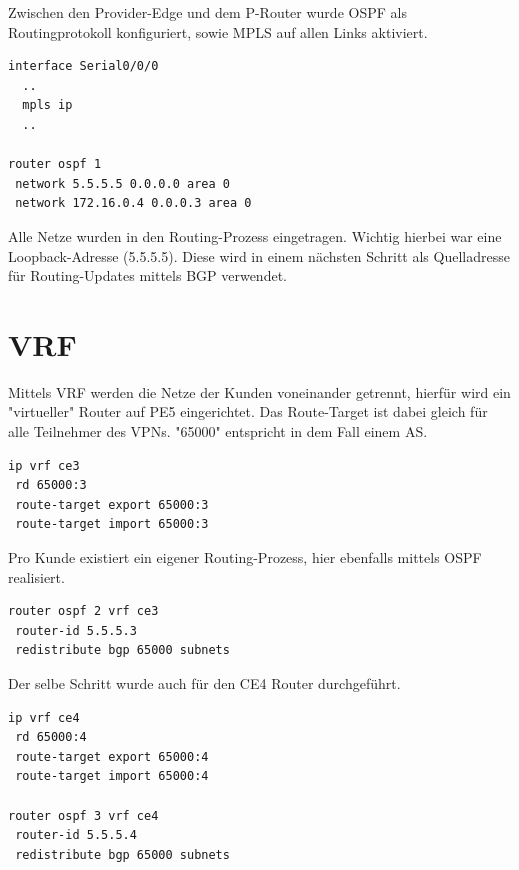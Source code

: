 Zwischen den Provider-Edge und dem P-Router wurde OSPF als Routingprotokoll konfiguriert, sowie \ac{MPLS} auf allen Links aktiviert.

\begin{lstlisting}[caption={PE5, MPLS und OSPF-Konfiguration},label={lst:mon2},language={}]
interface Serial0/0/0
  ..
  mpls ip
  ..
  
router ospf 1
 network 5.5.5.5 0.0.0.0 area 0
 network 172.16.0.4 0.0.0.3 area 0
\end{lstlisting}

Alle Netze wurden in den Routing-Prozess eingetragen. Wichtig hierbei war eine Loopback-Adresse (5.5.5.5). Diese wird in einem nächsten Schritt als Quelladresse für Routing-Updates mittels \ac{BGP} verwendet.


\section{VRF}

Mittels \ac{VRF} werden die Netze der Kunden voneinander getrennt, hierfür wird ein "virtueller" Router auf PE5 eingerichtet. Das Route-Target ist dabei gleich für alle Teilnehmer des VPNs. "65000" entspricht in dem Fall einem \ac{AS}.

\begin{lstlisting}[caption={VRF CE3},label={lst:mon3},language={}]
ip vrf ce3
 rd 65000:3
 route-target export 65000:3
 route-target import 65000:3
\end{lstlisting}

Pro Kunde existiert ein eigener Routing-Prozess, hier ebenfalls mittels \ac{OSPF} realisiert.

\begin{lstlisting}[caption={OSPF für CE3},label={lst:mon4},language={}]
router ospf 2 vrf ce3
 router-id 5.5.5.3
 redistribute bgp 65000 subnets
\end{lstlisting}

Der selbe Schritt wurde auch für den CE4 Router durchgeführt.

\begin{lstlisting}[caption={VRF und OSPF CE4},label={lst:mon5},language={}]
ip vrf ce4
 rd 65000:4
 route-target export 65000:4
 route-target import 65000:4
 
router ospf 3 vrf ce4
 router-id 5.5.5.4
 redistribute bgp 65000 subnets
\end{lstlisting}

